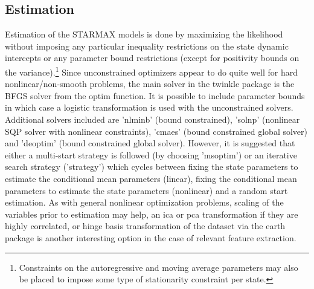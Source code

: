 \subsection{Estimation}
Estimation of the STARMAX models is done by maximizing the likelihood without
imposing any particular inequality restrictions on the state dynamic intercepts
or any parameter bound restrictions (except for positivity bounds on the
variance).\footnote{Constraints on the autoregressive and moving average
parameters may also be placed to impose some type of stationarity constraint
per state.} Since unconstrained optimizers appear to do quite well for hard
nonlinear/non-smooth problems, the main solver in the twinkle package is the
BFGS solver from the optim function. It is possible to include parameter bounds
in which case a logistic transformation is used with the unconstrained solvers.
Additional solvers included are 'nlminb' (bound constrained), 'solnp'
(nonlinear SQP solver with nonlinear constraints), 'cmaes' (bound constrained
global solver) and 'deoptim' (bound constrained global solver).
However, it is suggested that either a multi-start strategy is followed
(by choosing 'msoptim') or an iterative search strategy ('strategy') which
cycles between fixing the state parameters to estimate the conditional mean 
parameters (linear), fixing the conditional mean parameters to estimate the
state parameters (nonlinear) and a random start estimation. As with general
nonlinear optimization problems, scaling of the variables prior to estimation
may help, an ica or pca transformation if they are highly correlated, or hinge
basis transformation of the dataset via the earth package is another interesting
option in the case of relevant feature extraction.

